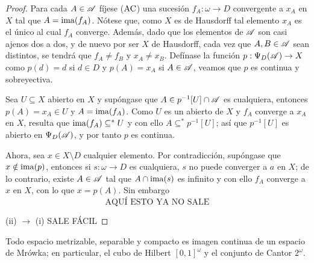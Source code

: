 \begin{proof}
 Para cada $A \in \mathscr{A}$ fíjese ($\operatorname{AC}$) una sucesión $f_A:\omega \to D$ convergente a $x_A$ en $X$ tal que $A=\operatorname{ima}(f_A)$. Nótese que, como $X$ es de Hausdorff tal elemento $x_A$ es el único al cual $f_A$ converge. Además, dado que los elementos de $\mathscr{A}$ son casi ajenos dos a dos, y de nuevo por ser $X$ de Hausdorff, cada vez que $A,B \in \mathscr{A}$ sean distintos, se tendrá que $f_A \neq f_B$ y $x_A \neq x_B$. Defínase la función $p:\Psi_D(\mathscr{A}) \to X$ como $p(d)=d$ si $d \in D$ y $p(A)=x_A$ si $A \in \mathscr{A}$, veamos que $p$ es continua y sobreyectiva.
 
 Sea $U \subseteq X$ abierto en $X$ y supóngase que $A \in p^{-1}[U] \cap \mathscr{A}$ es cualquiera, entonces $p(A)=x_A \in U$ y $A=\operatorname{ima}(f_A)$. Como $U$ es un abierto de $X$ y $f_A$ converge a $x_A$ en $X$, resulta que $\operatorname{ima}(f_A) \subseteq^* U$ y con ello $A \subseteq^* p^{-1}[U]$; así que $p^{-1}[U]$ es abierto en $\Psi_D(\mathscr{A})$, y por tanto $p$ es continua.
 
 Ahora, sea $x \in X \setminus D$ cualquier elemento. Por contradicción, supóngase que $x \notin \operatorname{ima}(p)$, entonces si $s:\omega \to D$ es cualquiera, $s$ no puede converger a $a$ en $X$; de lo contrario, existe $A \in \mathscr{A}$ tal que $A \cap \operatorname{ima}(s)$ es infinito y con ello $f_A$ converge a $x$ en $X$, con lo que $x=p(A)$. Sin embargo 
 $$ \text{AQUÍ ESTO YA NO SALE} $$

 (ii) $\to$ (i) SALE FÁCIL
 \end{proof}
 
 \begin{corolario}
  Todo espacio metrizable, separable y compacto es imagen continua de un espacio de Mrówka; en particular, el cubo de Hilbert $[0,1]^\omega$ y el conjunto de Cantor $2^\omega$.
 \end{corolario}